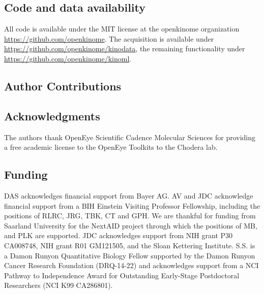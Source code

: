\documentclass[9pt,lessons]{livecoms}
\begin{document}
\subsection{Code and data availability}
All code is available under the MIT license at the openkinome organization \url{https://github.com/openkinome}. The acquisition is available under \url{https://github.com/openkinome/kinodata}, the remaining functionality under \url{https://github.com/openkinome/kinoml}.

\subsection{Author Contributions}

\subsection{Acknowledgments}

The authors thank OpenEye Scientific Cadence Molecular Sciences for providing a free academic license to the OpenEye Toolkits to the Chodera lab.


\subsection{Funding}

DAS acknowledges financial support from Bayer AG. AV and JDC acknowledge financial support from a BIH Einstein Visiting Professor Fellowship, including the positions of RLRC, JRG, TBK, CT and GPH. We are thankful for funding from Saarland University for the NextAID project through which the positions of MB, and PLK are supported. JDC acknowledges support from NIH grant P30 CA008748, NIH grant R01 GM121505, and the Sloan Kettering Institute.  S.S. is a Damon Runyon Quantitative Biology Fellow supported by the Damon Runyon Cancer Research Foundation (DRQ-14-22) and acknowledges support from a NCI Pathway to Independence Award for Outstanding Early-Stage Postdoctoral Researchers (NCI K99 CA286801).
\end{document}
